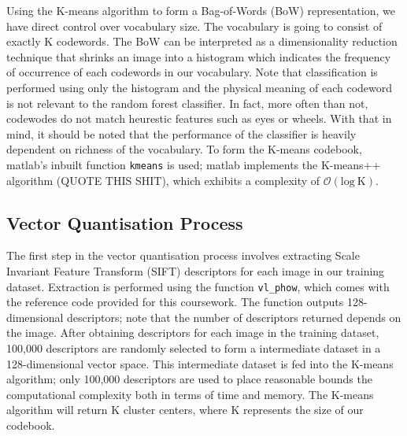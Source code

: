 \documentclass[a4paper,pra,twocolumn,10pt,aps,longbibliography,nobalancelastpage]{revtex4-1}
\begin{document}
Using the K-means algorithm to form a Bag-of-Words (BoW) representation, we have direct control over vocabulary size. The vocabulary is going to consist of exactly K codewords. The BoW can be interpreted as a dimensionality reduction technique that shrinks an image into a histogram which indicates the frequency of occurrence of each codewords in our vocabulary. Note that classification is performed using only the histogram and the physical meaning of each codeword is not relevant to the random forest classifier. In fact, more often than not, codewodes do not match heurestic features such as eyes or wheels. With that in mind, it should be noted that the performance of the classifier is heavily dependent on richness of the vocabulary. To form the K-means codebook, matlab's inbuilt function \texttt{kmeans} is used; matlab implements the K-means++ algorithm (QUOTE THIS SHIT), which exhibits a complexity of $\mathcal{O}(\text{log} \ \text{K})$.

\subsection*{Vector Quantisation Process}

The first step in the vector quantisation process involves extracting Scale Invariant Feature Transform (SIFT) descriptors for each image in our training dataset. Extraction is performed using the function \texttt{vl\_phow}, which comes with the reference code provided for this coursework. The function outputs 128-dimensional descriptors; note that the number of descriptors returned depends on the image. After obtaining descriptors for each image in the training dataset, 100,000 descriptors are randomly selected to form a intermediate dataset in a 128-dimensional vector space. This intermediate dataset is fed into the K-means algorithm; only 100,000 descriptors are used to place reasonable bounds the computational complexity both in terms of time and memory. The K-means algorithm will return K cluster centers, where K represents the size of our codebook.
\end{document}
